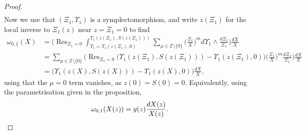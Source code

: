 \documentclass[10pt,a4paper,oneside,no-math,reqno]{amsart}%
\theoremstyle{plain}
\theoremstyle{definition}
\theoremstyle{remark}
\numberwithin{equation}{section}
\newcommand{\mb}[1]{\mathbb{#1}}
\newcommand{\1}{\mathds{1}}
\newcommand{\Z}{\mb{Z}}
\newcommand{\<}{\langle}
\renewcommand{\>}{\rangle}
\DeclareMathOperator*{\Res}{Res}
\begin{document}
\begin{proof}
\begin{equation}
\begin{split}
        \end{split}
    \end{equation}
    Now we use that $ ( \Xi_1, \Upsilon_1 ) $ is a symplectomorphism, and write $ z(\Xi_1) $ for the local inverse to $ \Xi_1 (z)$ near $ z = \Xi_1 = 0$ to find
    \begin{equation}
        \begin{split}
            \omega_{0,1}(X)
            &=
            \Big( \Res_{\Xi_1 = 0}  \int_{\Upsilon_1 = \Upsilon_1 (z(\Xi_1),0)}^{\Upsilon_1(z(\Xi_1),S(z(\Xi_1)))} \sum_{\mu \in \Z \setminus \{ 0\} } \big( \frac{\Xi_1}{X} \big)^m d\Upsilon_1 \wedge\frac{d\Xi_1}{\Xi_1  } \Big) \frac{dX}{X}
            \\
            &=
            \sum_{\mu \in \Z \setminus \{ 0\} } \Big( \Res_{\Xi_1 = 0} \big( \Upsilon_1(z(\Xi_1),S(z(\Xi_1))) - \Upsilon_1 (z(\Xi_1),0) \big) \big( \frac{\Xi_1}{X} \big)^m \frac{d\Xi_1}{\Xi_1  } \Big) \frac{dX}{X}
            \\
            &=
            \Big( \Upsilon_1(z(X),S(z(X))) - \Upsilon_1 (z(X),0) \Big) \frac{dX}{X},
        \end{split}
    \end{equation}
    using that the $ \mu = 0$ term vanishes, as $ z(0) = S(0) = 0$. Equivalently, using the parametrisation given in the proposition,
    \begin{equation}
        \omega_{0,1} (X (z)) = y(z) \frac{dX(z)}{X(z)}.\qedhere
    \end{equation}
\end{proof}
\end{document}
